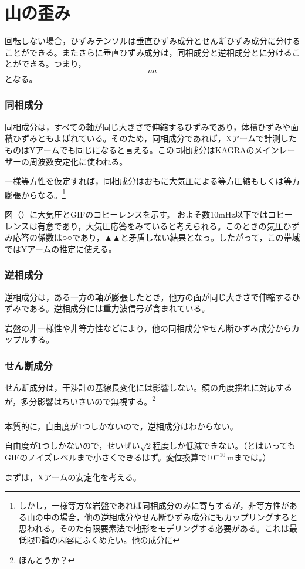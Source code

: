 \section{山の歪み}
回転しない場合，ひずみテンソルは垂直ひずみ成分とせん断ひずみ成分に分けることができる。またさらに垂直ひずみ成分は，同相成分と逆相成分とに分けることができる。つまり，
\begin{equation}\label{eq:eq43}
  aa
\end{equation}
となる。


\subsubsection{同相成分}
同相成分は，すべての軸が同じ大きさで伸縮するひずみであり，体積ひずみや面積ひずみともよばれている。そのため，同相成分であれば，Xアームで計測したものはYアームでも同じになると言える。この同相成分はKAGRAのメインレーザーの周波数安定化に使われる。


一様等方性を仮定すれば，同相成分はおもに大気圧による等方圧縮もしくは等方膨張からなる。\footnote[6]{しかし，一様等方な岩盤であれば同相成分のみに寄与するが，非等方性がある山の中の場合，他の逆相成分やせん断ひずみ成分にもカップリングすると思われる。そのた有限要素法で地形をモデリングする必要がある。これは最低限D論の内容にふくめたい。他の成分に}


図（）に大気圧とGIFのコヒーレンスを示す。
およそ数10mHz以下ではコヒーレンスは有意であり，大気圧応答をみていると考えられる。このときの気圧ひずみ応答の係数は○○であり，▲▲と矛盾しない結果となっ。したがって，この帯域ではYアームの推定に使える。



\subsubsection{逆相成分}
逆相成分は，ある一方の軸が膨張したとき，他方の面が同じ大きさで伸縮するひずみである。逆相成分には重力波信号が含まれている。


岩盤の非一様性や非等方性などにより，他の同相成分やせん断ひずみ成分からカップルする。


\subsubsection{せん断成分}
せん断成分は，干渉計の基線長変化には影響しない。鏡の角度揺れに対応するが，多分影響はちいさいので無視する。\footnote[7]{ほんとうか？}

\subsubsection{}


本質的に，自由度が1つしかないので，逆相成分はわからない。


自由度が1つしかないので，せいぜい$\sqrt{2}$程度しか低減できない。（とはいってもGIFのノイズレベルまで小さくできるはず。変位換算で$10^{-10}\, \mathrm{m}$までは。）


まずは，Xアームの安定化を考える。

